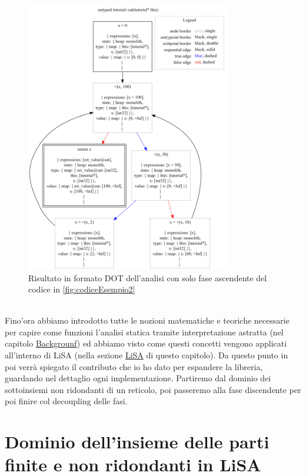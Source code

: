 \begin{figure}[ht]
	\centering
	\includegraphics[width=0.8\textwidth]{Immagini/graphviz.png}
	\caption{Risultato in formato DOT dell'analisi con solo fase ascendente del codice in \ref{fig:codiceEsempio2}}
	\label{fig:risultatoDOTAsc}
\end{figure}
\\

Fino'ora abbiamo introdotto tutte le nozioni matematiche e teoriche necessarie per capire come funzioni l'analisi statica tramite interpretazione astratta (nel capitolo \hyperref[chapter:background]{Backgrounf}) ed abbiamo visto come questi concetti vengono applicati all'interno di LiSA (nella sezione \hyperref[sec:LiSA]{LiSA} di questo capitolo). Da questo punto in poi verrà spiegato il contributo che io ho dato per espandere la libreria, guardando nel dettaglio ogni implementazione. Partiremo dal dominio dei sottoinsiemi non ridondanti di un reticolo, poi passeremo alla fase discendente per poi finire col decoupling delle fasi.

\section{Dominio dell'insieme delle parti finite e non ridondanti in LiSA}

